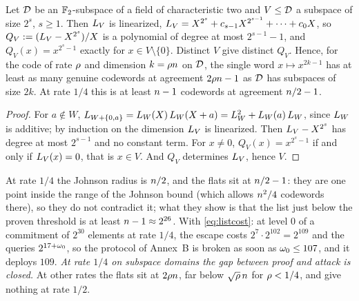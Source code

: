 \begin{proposition}[Flats]\label{prop:flats}
Let $\mathcal{D}$ be an $\mathbb{F}_2$-subspace of a field of characteristic two and $V\le\mathcal{D}$ a subspace of size $2^s$, $s\ge1$. Then $L_V$ is linearized, $L_V=X^{2^s}+c_{s-1}X^{2^{s-1}}+\dots+c_0X$, so $Q_V:=(L_V-X^{2^s})/X$ is a polynomial of degree at most $2^{s-1}-1$, and $Q_V(x)=x^{2^s-1}$ exactly for $x\in V\setminus\{0\}$. Distinct $V$ give distinct $Q_V$. Hence, for the code of rate $\rho$ and dimension $k=\rho n$ on $\mathcal{D}$, the single word $x\mapsto x^{2k-1}$ has at least as many genuine codewords at agreement $2\rho n-1$ as $\mathcal{D}$ has subspaces of size $2k$. At rate $1/4$ this is at least $n-1$ codewords at agreement $n/2-1$.
\end{proposition}
\begin{proof}
For $a\notin W$, $L_{W+\{0,a\}}=L_W(X)\,L_W(X+a)=L_W^2+L_W(a)\,L_W$, since $L_W$ is additive; by induction on the dimension $L_V$ is linearized. Then $L_V-X^{2^s}$ has degree at most $2^{s-1}$ and no constant term. For $x\ne0$, $Q_V(x)=x^{2^s-1}$ if and only if $L_V(x)=0$, that is $x\in V$. And $Q_V$ determines $L_V$, hence $V$.
\end{proof}

At rate $1/4$ the Johnson radius is $n/2$, and the flats sit at $n/2-1$: they are one point inside the range of the Johnson bound (which allows $n^2/4$ codewords there), so they do not contradict it; what they show is that the list just below the proven threshold is at least $n-1\approx2^{26}$. With \eqref{eq:listcost}: at level $0$ of a commitment of $2^{30}$ elements at rate $1/4$, the escape costs $2^{7}\cdot2^{102}=2^{109}$ and the queries $2^{17+\omega_0}$, so the protocol of Annex~B is broken as soon as $\omega_0\le107$, and it deploys $109$. \emph{At rate $1/4$ on subspace domains the gap between proof and attack is closed.} At other rates the flats sit at $2\rho n$, far below $\sqrt{\rho}\,n$ for $\rho<1/4$, and give nothing at rate $1/2$.

